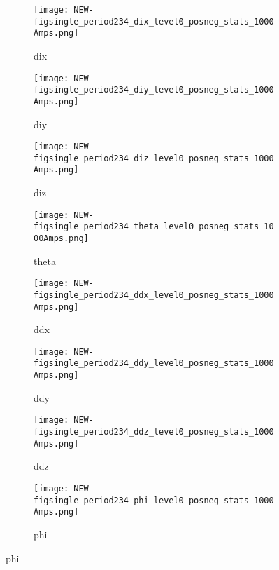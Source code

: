 \begin{figure}[h]
            \begin{subfigure}[b]{0.24\textwidth}
            \centering
            \texttt{[image: NEW-figsingle\_period234\_dix\_level0\_posneg\_stats\_1000Amps.png]}
            \caption{dix}
            \label{fig_dix1}
            \end{subfigure}
            \hfill             
             \begin{subfigure}[b]{0.24\textwidth}
            \centering
            \texttt{[image: NEW-figsingle\_period234\_diy\_level0\_posneg\_stats\_1000Amps.png]}
            \caption{diy}
            \label{fig_diy1}
            \end{subfigure}
             \hfill   
             \begin{subfigure}[b]{0.24\textwidth}
            \centering
            \texttt{[image: NEW-figsingle\_period234\_diz\_level0\_posneg\_stats\_1000Amps.png]}
            \caption{diz}
            \label{fig_diz1}
            \end{subfigure}
             \hfill   
             \begin{subfigure}[b]{0.24\textwidth}
            \centering
            \texttt{[image: NEW-figsingle\_period234\_theta\_level0\_posneg\_stats\_1000Amps.png]}
            \caption{theta}
            \label{fig_theta1}
            \end{subfigure}
            
            
                        \begin{subfigure}[b]{0.24\textwidth}
            \centering
            \texttt{[image: NEW-figsingle\_period234\_ddx\_level0\_posneg\_stats\_1000Amps.png]}
            \caption{ddx}
            \label{fig_ddx1}
            \end{subfigure}
            \hfill             
             \begin{subfigure}[b]{0.24\textwidth}
            \centering
            \texttt{[image: NEW-figsingle\_period234\_ddy\_level0\_posneg\_stats\_1000Amps.png]}
            \caption{ddy}
            \label{fig_ddy1}
            \end{subfigure}
             \hfill   
             \begin{subfigure}[b]{0.24\textwidth}
            \centering
            \texttt{[image: NEW-figsingle\_period234\_ddz\_level0\_posneg\_stats\_1000Amps.png]}
            \caption{ddz}
            \label{fig_ddz1}
            \end{subfigure}
             \hfill   
             \begin{subfigure}[b]{0.24\textwidth}
            \centering
            \texttt{[image: NEW-figsingle\_period234\_phi\_level0\_posneg\_stats\_1000Amps.png]}
            \caption{phi}
            \label{fig_phi1}
            \end{subfigure}
            

\end{figure}
